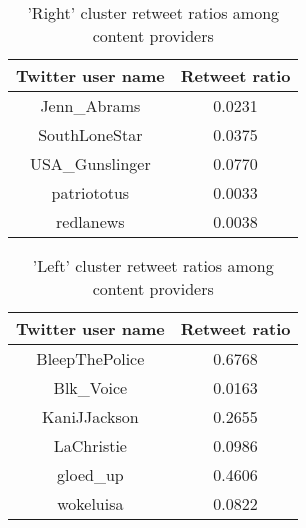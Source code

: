 \documentclass[12pt, authoryear]{elsarticle}
\begin{document}
\begin{center}
\begin{table}
\begin{tabular}{ c c } 
Twitter user name & Retweet ratio \\
 \hline
Jenn\_Abrams	&	0.0231\\
SouthLoneStar	&	0.0375\\
USA\_Gunslinger&	0.0770\\
patriototus		&	0.0033\\
redlanews		&	0.0038\\
 \hline
\end{tabular}
\caption{'Right' cluster retweet ratios among content providers}
\label{table:1}
\end{table}
\end{center}

\begin{center}
\begin{table}
\begin{tabular}{ c c } 
Twitter user name & Retweet ratio \\
 \hline
BleepThePolice &   0.6768 \\
Blk\_Voice       &  0.0163 \\
KaniJJackson   &   0.2655 \\
LaChristie  &      0.0986 \\
gloed\_up       &   0.4606 \\
wokeluisa     &    0.0822 \\
 \hline
\end{tabular}
\caption{'Left' cluster retweet ratios among content providers}
\label{table:2}
\end{table}
\end{center}
\end{document}
